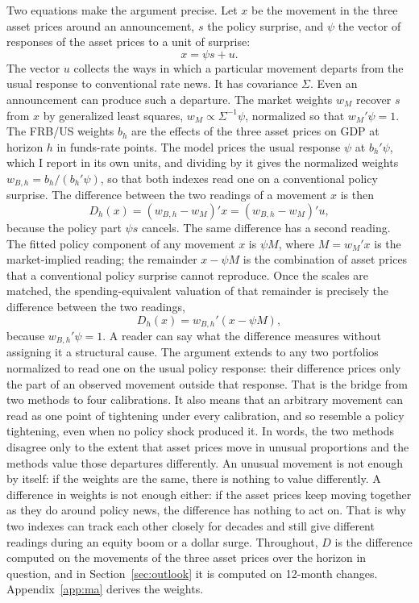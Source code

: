 \documentclass[11pt]{article}
\begin{document}
Two equations make the argument precise. Let $x$ be the movement in the three asset prices around an announcement, $s$ the policy surprise, and $\psi$ the vector of responses of the asset prices to a unit of surprise:
\begin{equation}\label{eq:decomp}
x=\psi s+u .
\end{equation}
The vector $u$ collects the ways in which a particular movement departs from the usual response to conventional rate news. It has covariance $\Sigma$. Even an announcement can produce such a departure. The market weights $w_M$ recover $s$ from $x$ by generalized least squares, $w_M\propto\Sigma^{-1}\psi$, normalized so that $w_M'\psi=1$. The FRB/US weights $b_h$ are the effects of the three asset prices on GDP at horizon $h$ in funds-rate points. The model prices the usual response $\psi$ at $b_h'\psi$, which I report in its own units, and dividing by it gives the normalized weights $w_{B,h}=b_h/(b_h'\psi)$, so that both indexes read one on a conventional policy surprise. The difference between the two readings of a movement $x$ is then
\begin{equation}\label{eq:D}
D_h(x)=(w_{B,h}-w_M)'x=(w_{B,h}-w_M)'u ,
\end{equation}
because the policy part $\psi s$ cancels. The same difference has a second reading. The fitted policy component of any movement $x$ is $\psi M$, where $M=w_M'x$ is the market-implied reading; the remainder $x-\psi M$ is the combination of asset prices that a conventional policy surprise cannot reproduce. Once the scales are matched, the spending-equivalent valuation of that remainder is precisely the difference between the two readings,
\begin{equation}\label{eq:rem}
D_h(x)=w_{B,h}'(x-\psi M),
\end{equation}
because $w_{B,h}'\psi=1$. A reader can say what the difference measures without assigning it a structural cause. The argument extends to any two portfolios normalized to read one on the usual policy response: their difference prices only the part of an observed movement outside that response. That is the bridge from two methods to four calibrations. It also means that an arbitrary movement can read as one point of tightening under every calibration, and so resemble a policy tightening, even when no policy shock produced it. In words, the two methods disagree only to the extent that asset prices move in unusual proportions and the methods value those departures differently. An unusual movement is not enough by itself: if the weights are the same, there is nothing to value differently. A difference in weights is not enough either: if the asset prices keep moving together as they do around policy news, the difference has nothing to act on. That is why two indexes can track each other closely for decades and still give different readings during an equity boom or a dollar surge. Throughout, $D$ is the difference computed on the movements of the three asset prices over the horizon in question, and in Section~\ref{sec:outlook} it is computed on 12-month changes. Appendix~\ref{app:ma} derives the weights.
\end{document}
